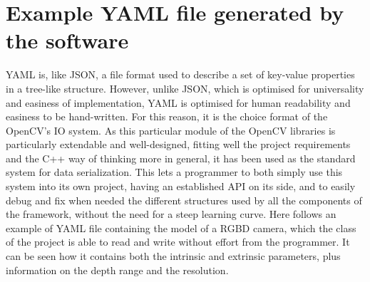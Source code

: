 \chapter{Example YAML file generated by the software} \label{app:yml}
YAML is, like JSON, a file format used to describe a set of key-value
properties in a tree-like structure. However, unlike JSON, which is
optimised for universality and easiness of implementation, YAML is
optimised for human readability and easiness to be hand-written. For
this reason, it is the choice format of the OpenCV's IO system. As
this particular module of the OpenCV libraries is particularly
extendable and well-designed, fitting well the project requirements
and the C++ way of thinking more in general, it has been used as the
standard system for data serialization. This lets a programmer to both
simply use this system into its own project, having an established
API on its side, and to easily debug and fix when needed the different
structures used by all the components of the framework, without the
need for a steep learning curve. Here follows an example of
YAML file containing the model of a RGBD camera, which the
 class of the project is able to read and write
without effort from the programmer. It can be seen how it contains
both the intrinsic and extrinsic parameters, plus information on the
depth range and the resolution.

\paragraph{}
